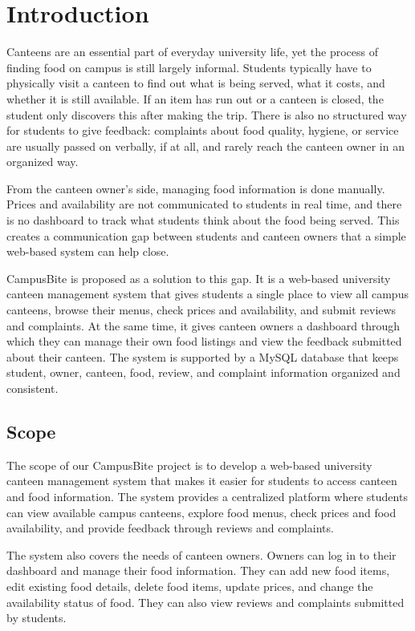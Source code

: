 \documentclass[ 12pt,a4paper,twocolumn,fleqn]{article}
\begin{document}
\section{Introduction}

Canteens are an essential part of everyday university life, yet the process of finding food on campus is still largely informal. Students typically have to physically visit a canteen to find out what is being served, what it costs, and whether it is still available. If an item has run out or a canteen is closed, the student only discovers this after making the trip. There is also no structured way for students to give feedback: complaints about food quality, hygiene, or service are usually passed on verbally, if at all, and rarely reach the canteen owner in an organized way.

From the canteen owner's side, managing food information is done manually. Prices and availability are not communicated to students in real time, and there is no dashboard to track what students think about the food being served. This creates a communication gap between students and canteen owners that a simple web-based system can help close.

CampusBite is proposed as a solution to this gap. It is a web-based university canteen management system that gives students a single place to view all campus canteens, browse their menus, check prices and availability, and submit reviews and complaints. At the same time, it gives canteen owners a dashboard through which they can manage their own food listings and view the feedback submitted about their canteen. The system is supported by a MySQL database that keeps student, owner, canteen, food, review, and complaint information organized and consistent.

\subsection{Scope}

The scope of our CampusBite project is to develop a web-based university canteen management system that makes it easier for students to access canteen and food information. The system provides a centralized platform where students can view available campus canteens, explore food menus, check prices and food availability, and provide feedback through reviews and complaints.

The system also covers the needs of canteen owners. Owners can log in to their dashboard and manage their food information. They can add new food items, edit existing food details, delete food items, update prices, and change the availability status of food. They can also view reviews and complaints submitted by students.
\end{document}
